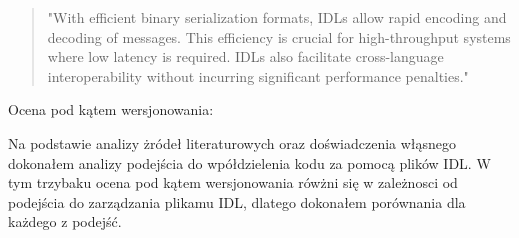 \documentclass[runningheads,12pt]{llncs}
\begin{document}
\begin{quote}
    "With efficient binary serialization formats, IDLs allow rapid encoding and decoding of messages. This efficiency is crucial for high-throughput systems where low latency is required. IDLs also facilitate cross-language interoperability without incurring significant performance penalties." ~\cite[p. 123]{kleppmann2017designing}
\end{quote}

Ocena pod kątem wersjonowania:

Na podstawie analizy żródeł literaturowych oraz doświadczenia włąsnego dokonałem analizy podejścia do wpółdzielenia kodu za pomocą plików IDL. W tym trzybaku ocena pod kątem wersjonowania rówżni się w zależnosci od podejścia do zarządzania plikamu IDL, dlatego dokonałem porównania dla każdego z podejść.
\end{document}
